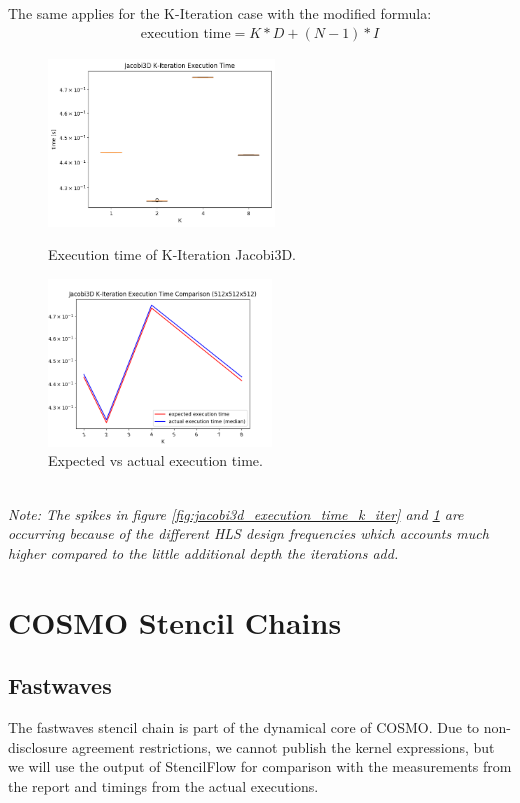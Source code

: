The same applies for the K-Iteration case with the modified formula:
\begin{align}
\text{execution time} = K*D + (N-1)*I
\end{align}
\begin{figure}[h]
	\begin{minipage}{.5\columnwidth}
		\centering
		\includegraphics[height=12em]{plots/jacobi3d_execution_time_k_iter.png}
		\caption{Execution time of K-Iteration Jacobi3D.}
		\label{fig:jacobi3d_execution_time_k_iter}
	\end{minipage}
	\begin{minipage}{.5\columnwidth}
		\centering
		\includegraphics[height=12em]{plots/jacobi3d_execution_time_k_iter_comparison.png}
		\caption{Expected vs actual execution time.}
		\label{fig:jacobi3d_execution_time_k_iter_comparison}
	\end{minipage}
\end{figure}
\\
\textit{Note: The spikes in figure \ref{fig:jacobi3d_execution_time_k_iter} and \ref{fig:jacobi3d_execution_time_k_iter_comparison}  are occurring because of the different HLS design frequencies which accounts much higher compared to the little additional depth the iterations add.}





\section{COSMO Stencil Chains}

\subsection{Fastwaves} 
The fastwaves stencil chain is part of the dynamical core of COSMO. Due to non-disclosure agreement restrictions, we cannot publish the kernel expressions, but we will use the output of StencilFlow for comparison with the measurements from the report and timings from the actual executions.

